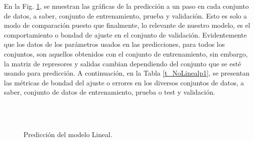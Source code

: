 \documentclass[12pt]{article}
\begin{document}
En la Fig. \ref{f_G123}, se muestran las gráficas de la predicción a un paso en cada conjunto de datos, a saber, conjunto de entrenamiento, prueba y validación. Esto es solo a modo de comparación puesto que finalmente, lo relevante de nuestro modelo, es el comportamiento o bondad de ajuste en el conjunto de validación. Evidentemente que los datos de los parámetros usados en las predicciones, para todos los conjuntos, son aquellos obtenidos con el conjunto de entrenamiento, sin embargo, la matriz de represores y salidas cambian dependiendo del conjunto que se esté usando para predicción. A continuación, en la Tabla \ref{t_NoLinealp1}, se presentan las métricas de bondad del ajuste o errores en los diversos conjuntos de datos, a saber, conjunto de datos de entrenamiento, prueba o test y validación.

\begin{figure}
		\centering
		\captionsetup{justification=centering}
		\\
		\\
		\caption{Predicción del modelo Lineal.}
		\label{f_G123}
\end{figure}
\end{document}
